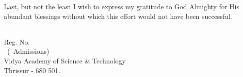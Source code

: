 \vspace{0.2cm}
\par
\hspace{0.35cm}Last, but not the least I wish to express my gratitude to God Almighty for His abundant blessings without which this effort would not have been successful.\\[.1 cm]



\begin{flushright}
\vauthor\\
Reg. No. \vregisternumber\\
\vclass\  (\vadmissionyear\  Admissions)\\
Vidya Academy of Science \& Technology\\
\vdate  \hfill Thrissur - 680 501.
\end{flushright}